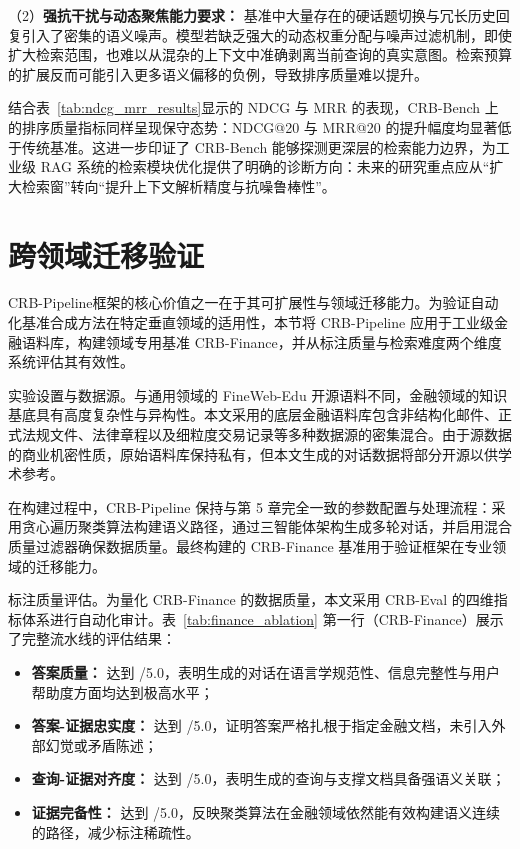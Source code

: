 （2）\textbf{强抗干扰与动态聚焦能力要求：} 基准中大量存在的硬话题切换与冗长历史回复引入了密集的语义噪声。模型若缺乏强大的动态权重分配与噪声过滤机制，即使扩大检索范围，也难以从混杂的上下文中准确剥离当前查询的真实意图。检索预算的扩展反而可能引入更多语义偏移的负例，导致排序质量难以提升。


结合表~\ref{tab:ndcg_mrr_results}显示的 NDCG 与 MRR 的表现，CRB-Bench 上的排序质量指标同样呈现保守态势：NDCG@20 与 MRR@20 的提升幅度均显著低于传统基准。这进一步印证了 CRB-Bench 能够探测更深层的检索能力边界，为工业级 RAG 系统的检索模块优化提供了明确的诊断方向：未来的研究重点应从``扩大检索窗''转向``提升上下文解析精度与抗噪鲁棒性''。























\section{跨领域迁移验证}
\label{sec:domain_transfer}

CRB-Pipeline框架的核心价值之一在于其可扩展性与领域迁移能力。为验证自动化基准合成方法在特定垂直领域的适用性，本节将 CRB-Pipeline 应用于工业级金融语料库，构建领域专用基准 CRB-Finance，并从标注质量与检索难度两个维度系统评估其有效性。

实验设置与数据源。与通用领域的 FineWeb-Edu 开源语料不同，金融领域的知识基底具有高度复杂性与异构性。本文采用的底层金融语料库包含非结构化邮件、正式法规文件、法律章程以及细粒度交易记录等多种数据源的密集混合。由于源数据的商业机密性质，原始语料库保持私有，但本文生成的对话数据将部分开源以供学术参考。

在构建过程中，CRB-Pipeline 保持与第 5 章完全一致的参数配置与处理流程：采用贪心遍历聚类算法构建语义路径，通过三智能体架构生成多轮对话，并启用混合质量过滤器确保数据质量。最终构建的 CRB-Finance 基准用于验证框架在专业领域的迁移能力。

标注质量评估。为量化 CRB-Finance 的数据质量，本文采用 CRB-Eval 的四维指标体系进行自动化审计。表~\ref{tab:finance_ablation} 第一行（CRB-Finance）展示了完整流水线的评估结果：
\begin{itemize}
    \item \textbf{答案质量：} 达到 \TBD{}/5.0，表明生成的对话在语言学规范性、信息完整性与用户帮助度方面均达到极高水平；
    \item \textbf{答案-证据忠实度：} 达到 \TBD{}/5.0，证明答案严格扎根于指定金融文档，未引入外部幻觉或矛盾陈述；
    \item \textbf{查询-证据对齐度：} 达到 \TBD{}/5.0，表明生成的查询与支撑文档具备强语义关联；
    \item \textbf{证据完备性：} 达到 \TBD{}/5.0，反映聚类算法在金融领域依然能有效构建语义连续的路径，减少标注稀疏性。
\end{itemize}

